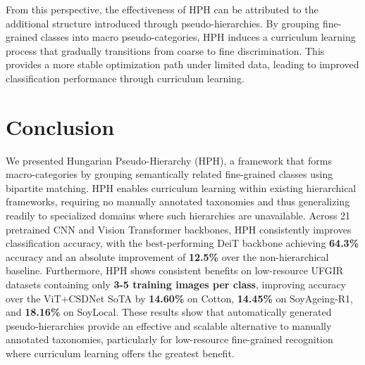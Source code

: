 \documentclass[conference,a4paper]{IEEEtran}
\begin{document}
From this perspective, the effectiveness of HPH can be attributed to the additional structure introduced through pseudo-hierarchies. By grouping fine-grained classes into macro pseudo-categories, HPH induces a curriculum learning process that gradually transitions from coarse to fine discrimination. This provides a more stable optimization path under limited data, leading to improved classification performance through curriculum learning.

\section{Conclusion}
\label{sec_conclusion}

We presented Hungarian Pseudo-Hierarchy (HPH), a framework that forms macro-categories by grouping semantically related fine-grained classes using bipartite matching. HPH enables curriculum learning within existing hierarchical frameworks, requiring no manually annotated taxonomies and thus generalizing readily to specialized domains where such hierarchies are unavailable. Across 21 pretrained CNN and Vision Transformer backbones, HPH consistently improves classification accuracy, with the best-performing DeiT backbone achieving \textbf{64.3\%} accuracy and an absolute improvement of \textbf{12.5\%} over the non-hierarchical baseline. Furthermore, HPH shows consistent benefits on low-resource UFGIR datasets containing only \textbf{3-5 training images per class}, improving accuracy over the ViT+CSDNet SoTA by \textbf{14.60\%} on Cotton, \textbf{14.45\%} on SoyAgeing-R1, and \textbf{18.16\%} on SoyLocal. These results show that automatically generated pseudo-hierarchies provide an effective and scalable alternative to manually annotated taxonomies, particularly for low-resource fine-grained recognition where curriculum learning offers the greatest benefit.



\end{document}
